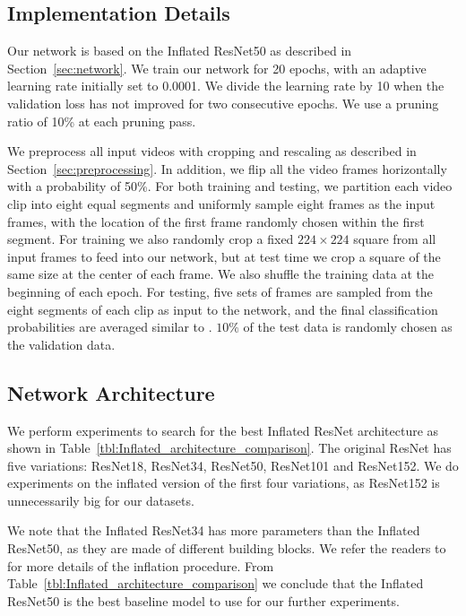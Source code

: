 \documentclass{article}
\begin{document}
\subsection{Implementation Details}

{Our network is based on the Inflated ResNet50 as described in Section~\ref{sec:network}. We train our network for 20 epochs, with an adaptive learning rate initially set to 0.0001. We divide the learning rate by 10 when the validation loss has not improved for two consecutive epochs. We use a pruning ratio of 10\% at each pruning pass.}

{We preprocess all input videos with cropping and rescaling as described in Section~\ref{sec:preprocessing}. In addition, we flip all the video frames horizontally with a probability of 50\%. For both training and testing, we partition each video clip into eight equal segments and uniformly sample eight frames as the input frames, with the location of the first frame randomly chosen within the first segment. For training we also randomly crop a fixed $224 \times 224$ square from all input frames to feed into our network, but at test time we crop a square of the same size at the center of each frame. We also shuffle the training data at the beginning of each epoch. For testing, five sets of frames are sampled from the eight segments of each clip as input to the network, and the final classification probabilities are averaged similar to \cite{Baradel_2018}. $10\%$ of the test data is randomly chosen as the validation data.} 

\subsection{Network Architecture}
\label{sec:resnet}
{We perform experiments to search for the best Inflated ResNet architecture as shown in Table~\ref{tbl:Inflated_architecture_comparison}. The original ResNet has five variations: ResNet18, ResNet34, ResNet50, ResNet101 and ResNet152. We do experiments on the inflated version of the first four variations, as ResNet152 is unnecessarily big for our datasets.}

{We note that the Inflated ResNet34 has more parameters than the Inflated ResNet50, as they are made of different building blocks. We refer the readers to \cite{carreira2017quo} for more details of the inflation procedure. From Table~\ref{tbl:Inflated_architecture_comparison} we conclude that the Inflated ResNet50 is the best baseline model to use for our further experiments.}
\end{document}
